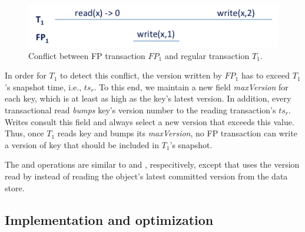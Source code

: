 \begin{figure}[htb]
\includegraphics[width=\columnwidth]{figs/FP-why-bump}
\caption{Conflict between FP transaction $FP_1$ and regular transaction $T_1$.}
\label{fig:why-bump}
\end{figure}

In order for $T_1$ to detect this 
conflict, the version written by $FP_1$ has to exceed $T_1$'s snapshot time, i.e., $ts_r$.
To this end, we maintain a new field \emph{maxVersion} for each key, which is at least as 
high as the key's latest version. In addition, every transactional read \emph{bumps} key's version 
number to the reading transaction's $ts_r$. 
Writes consult this field and always select a new version that exceeds this value.
Thus, once $T_1$ reads key and bumps its \emph{maxVersion}, 
no FP transaction can write a version of key that should be 
included in $T_1$'s snapshot.

The   and  operations are similar to  and , 
respecitively, except that  uses the version read by  instead of 
reading the object's latest committed version from the data store.

\subsection{Implementation and optimization}
\label{ssec:fast-impl}




